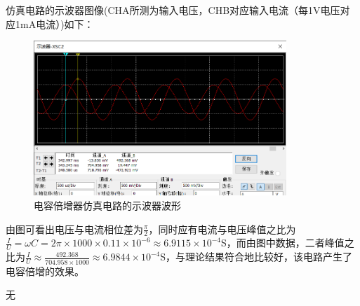 \documentclass[UTF8]{ctexart}
\begin{document}
仿真电路的示波器图像(CHA所测为输入电压，CHB对应输入电流（每1V电压对应1mA电流）)如下：
\begin{figure}[H]
\centering
\includegraphics[width=0.85\textwidth]{M.png}
\caption{电容倍增器仿真电路的示波器波形}
\end{figure}

由图可看出电压与电流相位差为$\frac{\pi}{2}$，同时应有电流与电压峰值之比为$\frac{I}{U}=\omega C=2\pi\times1000\times0.11\times10^{-6}\approx6.9115\times10^{-4}$S，而由图中数据，二者峰值之比为$\frac{I}{U}\approx\frac{492.368}{704.958\times1000}\approx6.9844\times10^{-4}$S，与理论结果符合地比较好，该电路产生了电容倍增的效果。
\begin{thebibliography}{123456} 
 无
\end{thebibliography}
\end{document}
